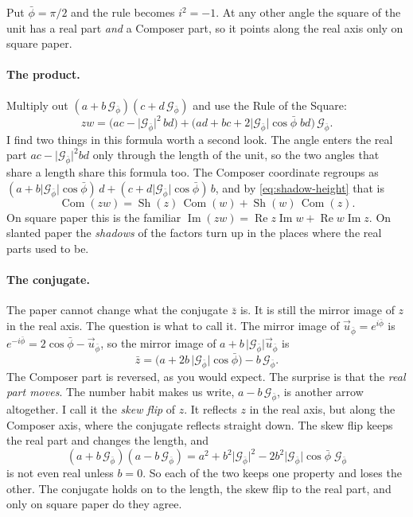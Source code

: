 \documentclass[11pt,a4paper]{article}
\theoremstyle{plain}
\theoremstyle{definition}
\newcommand{\pb}{\bar{\phi}}                     %
\newcommand{\Gp}{\mathcal{G}_{\bar{\phi}}}       %
\newcommand{\up}{\vec{u}_{\bar{\phi}}}           %
\newcommand{\G}{\lvert\Gp\rvert}                 %
\renewcommand{\Re}{\operatorname{Re}}
\DeclareMathOperator{\Com}{Com}
\DeclareMathOperator{\Sh}{Sh}
\begin{document}
Put $\pb = \pi/2$ and the rule becomes $i^2 = -1$. At any other angle the square of the unit has a real part \emph{and} a Composer part, so it points along the real axis only on square paper.

\paragraph{The product.} Multiply out $(a + b\,\Gp)(c + d\,\Gp)$ and use the Rule of the Square:
\begin{equation}\label{eq:product}
zw = \bigl(ac - \G^2\,bd\bigr) + \bigl(ad + bc + 2\G\cos\pb\;bd\bigr)\,\Gp .
\end{equation}
I find two things in this formula worth a second look. The angle enters the real part $ac - \G^2bd$ only through the length of the unit, so the two angles that share a length share this formula too. The Composer coordinate regroups as $(a + b\G\cos\pb)\,d + (c + d\G\cos\pb)\,b$, and by \eqref{eq:shadow-height} that is
\begin{equation}\label{eq:com-product}
\Com(zw) = \Sh(z)\,\Com(w) + \Sh(w)\,\Com(z) .
\end{equation}
On square paper this is the familiar $\operatorname{Im}(zw) = \Re z\operatorname{Im} w + \Re w\operatorname{Im} z$. On slanted paper the \emph{shadows} of the factors turn up in the places where the real parts used to be.

\paragraph{The conjugate.} The paper cannot change what the conjugate $\bar z$ is. It is still the mirror image of $z$ in the real axis. The question is what to call it. The mirror image of $\up = e^{i\pb}$ is $e^{-i\pb} = 2\cos\pb - \up$, so the mirror image of $a + b\,\G\up$ is
\begin{equation}\label{eq:conjugate}
\bar z = \bigl(a + 2b\,\G\cos\pb\bigr) - b\,\Gp .
\end{equation}
The Composer part is reversed, as you would expect. The surprise is that the \emph{real part moves}. The number habit makes us write, $a - b\,\Gp$, is another arrow altogether. I call it the \emph{skew flip} of $z$. It reflects $z$ in the real axis, but along the Composer axis, where the conjugate reflects straight down. The skew flip keeps the real part and changes the length, and
\[
(a + b\,\Gp)(a - b\,\Gp) = a^2 + b^2\G^2 - 2b^2\G\cos\pb\;\Gp
\]
is not even real unless $b = 0$. So each of the two keeps one property and loses the other. The conjugate holds on to the length, the skew flip to the real part, and only on square paper do they agree.
\end{document}
